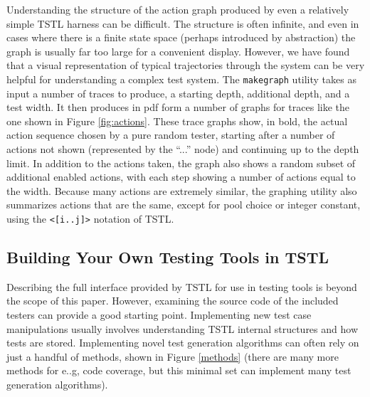 Understanding the structure of the action graph produced by even a relatively simple TSTL harness can be difficult.  The structure is often infinite, and even in cases where there is a finite state space (perhaps introduced by abstraction) the graph is usually far too large for a convenient display.  However, we have found that a visual representation of typical trajectories through the system can be very helpful for understanding a complex test system.  The {\tt makegraph} utility takes as input a number of traces to produce, a starting depth, additional depth, and a test width.  It then produces in pdf form a number of graphs for traces like the one shown in Figure \ref{fig:actions}.  These trace graphs show, in bold, the actual action sequence chosen by a pure random tester, starting after a number of actions not shown (represented by the ``...'' node) and continuing up to the depth limit.  In addition to the actions taken, the graph also shows a random subset of additional enabled actions, with each step showing a number of actions equal to the width.  Because many actions are extremely similar, the graphing utility also summarizes actions that are the same, except for pool choice or integer constant, using the {\tt <[i..j]>} notation of TSTL.

\subsection{Building Your Own Testing Tools in TSTL}
\label{sec:build}

Describing the full interface provided by TSTL for use in testing tools is beyond the scope of this paper.  However, examining the source code of the included testers can provide a good starting point.  Implementing new test case manipulations usually involves understanding TSTL internal structures and how tests are stored.  Implementing novel test generation algorithms can often rely on just a handful of methods, shown in Figure \ref{methods} (there are many more methods for e..g, code coverage, but this minimal set can implement many test generation algorithms).

